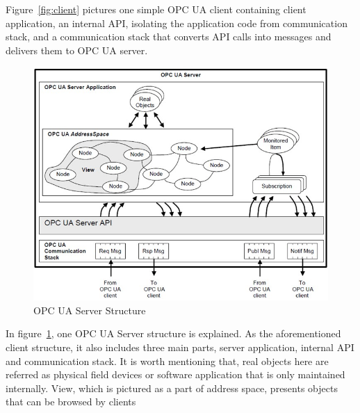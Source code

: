 \documentclass[]{llncs}
\begin{document}
Figure~\ref{fig:client} pictures one simple OPC UA client containing client application, an internal API, isolating the application code from communication stack, and a communication stack that converts API calls into messages and delivers them to OPC UA server.

\begin{figure}
	\centering
	\includegraphics[width=1\textwidth]{server.jpg}
		\caption[ ]{OPC UA Server Structure\cite{O1}}
	\label{fig:server}
\end{figure}

In figure~\ref{fig:server}, one OPC UA Server structure is explained. As the aforementioned client structure, it also includes three main parts, server application, internal API and communication stack. It is worth mentioning that, real objects here are referred as physical field devices or software application that is only maintained internally. View, which is pictured as a part of address space, presents objects that can be browsed by clients
\end{document}
